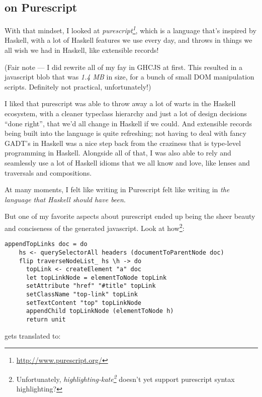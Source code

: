 \documentclass[]{article}
\renewcommand{\href}[2]{#2\footnote{\url{#1}}}
\begin{document}
\subsection{on Purescript}\label{on-purescript}

With that mindset, I looked at
\emph{\href{http://www.purescript.org/}{purescript}}, which is a
language that's inspired by Haskell, with a lot of Haskell features we
use every day, and throws in things we all wish we had in Haskell, like
extensible records!

(Fair note --- I did rewrite all of my fay in GHCJS at first. This
resulted in a javascript blob that was \emph{1.4 MB} in size, for a
bunch of small DOM manipulation scripts. Definitely not practical,
unfortunately!)

I liked that purescript was able to throw away a lot of warts in the
Haskell ecosystem, with a cleaner typeclass hierarchy and just a lot of
design decisions ``done right'', that we'd all change in Haskell if we
could. And extensible records being built into the language is quite
refreshing; not having to deal with fancy GADT's in Haskell was a nice
step back from the craziness that is type-level programming in Haskell.
Alongside all of that, I was also able to rely and seamlessly use a lot
of Haskell idioms that we all know and love, like lenses and traversals
and compositions.

At many moments, I felt like writing in Purescript felt like writing in
\emph{the language that Haskell should have been}.

But one of my favorite aspects about purescript ended up being the sheer
beauty and conciseness of the generated javascript. Look at
how\footnote{Unfortunately,
  \emph{\href{https://github.com/jgm/highlighting-kate}{highlighting-kate}}
  doesn't yet support purescript syntax highlighting?}:

\begin{verbatim}
appendTopLinks doc = do
    hs <- querySelectorAll headers (documentToParentNode doc)
    flip traverseNodeList_ hs \h -> do
      topLink <- createElement "a" doc
      let topLinkNode = elementToNode topLink
      setAttribute "href" "#title" topLink
      setClassName "top-link" topLink
      setTextContent "top" topLinkNode
      appendChild topLinkNode (elementToNode h)
      return unit
\end{verbatim}

gets translated to:
\end{document}
